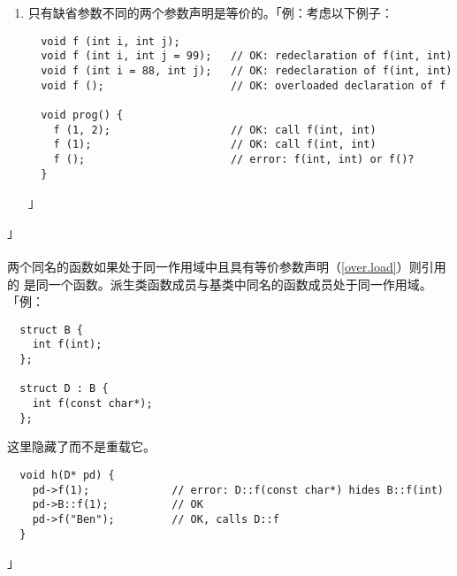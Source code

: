\begin{enumerate}
{\begin{lstlisting}
  int f (int);
  int f (const int);          // redeclaration of f(int)
  int f (int) { /* ... */ }   // definition of f(int)
  int f (cInt) { /* ... */ }  // error: redefinition of f(int)
\end{lstlisting}」

  只有参数类型规范最外层的和类型说明符按这种方式忽略；
  隐藏在参数类型规范内部的和类型说明符是有意义的，可用于
  区分重载函数声明。\footnote{当一个参数类型包含一个函数类型，比如指向函数的参数
  类型的情形，和内层函数类型的参数类型规范最外层的类型说
  明符也被忽略。}特别的，对任何类型，``指向的指针''，``指向
  的指针''和``指向的指针''被当成是不同的参数类型，
  ``的引用''，``的引用''和``的引用''也是如此。}
  \item{只有缺省参数不同的两个参数声明是等价的。「例：考虑以下例子：
\begin{lstlisting}
  void f (int i, int j);
  void f (int i, int j = 99);   // OK: redeclaration of f(int, int)
  void f (int i = 88, int j);   // OK: redeclaration of f(int, int)
  void f ();                    // OK: overloaded declaration of f

  void prog() {
    f (1, 2);                   // OK: call f(int, int)
    f (1);                      // OK: call f(int, int)
    f ();                       // error: f(int, int) or f()?
  }
\end{lstlisting}」}
\end{enumerate}」

\paragraph{}
两个同名的函数如果处于同一作用域中且具有等价参数声明（\ref{over.load}）则引用的
是同一个函数。派生类函数成员与基类中同名的函数成员处于同一作用域。「例：
\begin{lstlisting}
  struct B {
    int f(int);
  };

  struct D : B {
    int f(const char*);
  };
\end{lstlisting}
这里隐藏了而不是重载它。
\begin{lstlisting}
  void h(D* pd) {
    pd->f(1);             // error: D::f(const char*) hides B::f(int)
    pd->B::f(1);          // OK
    pd->f("Ben");         // OK, calls D::f
  }
\end{lstlisting}」

